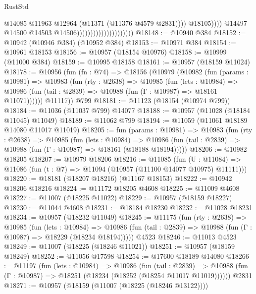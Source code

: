 \begin{lexlean}{RustStd}
\begin{coremodule}
                                                          @14085
                                                          @11963
                                                          @12964
                                                          (@11371 (@11376 @4579 @2831))))
                                                      @18105))))
                                              @14497
                                              @14500
                                              @14503
                                              @14506)))))))))))))))))))))
@18148 := @10940 @384
@18152 := @10942 (@10946 @384) (@10952 @384)
@18153 := @10971 @384
@18154 := @10961 @18153
@18156 := @10957 (@18154 @10976)
@18158 := @10999 (@11000 @384)
@18159 := @10995 @18158
@18161 := @10957 (@18159 @11024)
@18178 := @10956
    (fun (fn : @74) =>
    @18156
      (@10979
        (@10982
          (fun (params : @10981) =>
          @10983
            (fun (rty : @2638) =>
            @10985
              (fun (lets : @10984) =>
              @10986 (fun (tail : @2839) => @10988 (fun (Γ : @10987) => @18161 @11071))))))
        @11117))
    @799
@18181 := @11123 (@18154 (@10974 @799))
@18184 := @11036 (@11037 @799) @14077
@18188 := @10957 (@11028 (@18184 @11045) @11049)
@18189 := @11062 @799
@18194 := @11059 (@11061 @18189 @14080 @11017 @11019)
@18205 := fun (params : @10981) =>
  @10983
    (fun (rty : @2638) =>
    @10985
      (fun (lets : @10984) =>
      @10986 (fun (tail : @2839) => @10988 (fun (Γ : @10987) => @18161 (@18188 @18194)))))
@18206 := @10982 @18205
@18207 := @10979 @18206
@18216 := @11085
    (fun (U : @11084) => @11086 (fun (t : @7) => @11094 (@10957 (@11100 @14077 @10975) @11111)))
@18220 := @18181 (@18207 @18216) (@11167 @18153)
@18222 := @10942 @18206 @18216
@18224 := @11172 @18205 @4608
@18225 := @11009 @4608
@18227 := @11007 (@18225 @11022)
@18229 := @10957 (@18159 @18227)
@18230 := @11044 @4608
@18231 := @18184 @18230
@18232 := @11028 @18231
@18234 := @10957 (@18232 @11049)
@18245 := @11175
    (fun (rty : @2638) =>
    @10985
      (fun (lets : @10984) =>
      @10986 (fun (tail : @2839) => @10988 (fun (Γ : @10987) => @18229 (@18234 @18194)))))
    @4523
@18246 := @11013 @4523
@18249 := @11007 (@18225 (@18246 @11021))
@18251 := @10957 (@18159 @18249)
@18252 := @11056 @17598
@18254 := @17600 @18189 @14080
@18266 := @11197
    (fun (lets : @10984) =>
    @10986
      (fun (tail : @2839) =>
      @10988 (fun (Γ : @10987) => @18251 (@18234 (@18252 (@18254 @11017 @11019))))))
    @2831
@18271 := @10957 (@18159 (@11007 (@18225 (@18246 @13122))))

\end{coremodule}
\end{lexlean}
